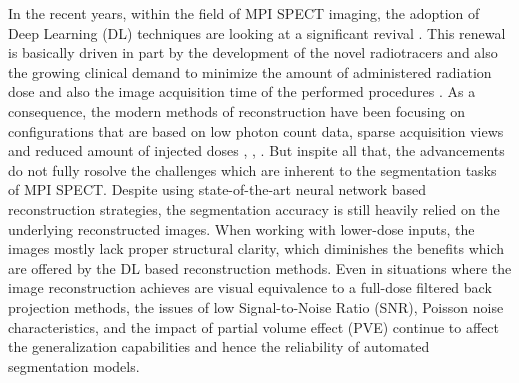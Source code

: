In the recent years, within the field of MPI SPECT imaging, the adoption of Deep Learning (DL) techniques are looking at a significant revival \cite{tolu2025advancements}. This renewal is basically driven in part by the development of the novel radiotracers and also the growing clinical demand to minimize the amount of administered radiation dose and also the image acquisition time of the performed procedures \cite{henzlova2011future}. As a consequence, the modern methods of reconstruction have been focusing on configurations that are based on low photon count data, sparse acquisition views and reduced amount of injected doses \cite{xie2023transformer}, \cite{xie2024generalizable}, \cite{chen2024dudocfnet}. But inspite all that, the advancements do not fully rosolve the challenges which are inherent to  the segmentation tasks of MPI SPECT. Despite using state-of-the-art neural network based reconstruction strategies, the segmentation accuracy is still heavily relied on the underlying reconstructed images. When working with lower-dose inputs, the images mostly lack proper structural clarity, which diminishes the benefits which are offered by the DL based reconstruction methods. Even in situations where the image reconstruction achieves are visual equivalence to a full-dose filtered back projection methods, the issues of low Signal-to-Noise Ratio (SNR), Poisson noise characteristics, and the impact of partial volume effect (PVE) continue to affect the generalization capabilities and hence the reliability of automated segmentation models.